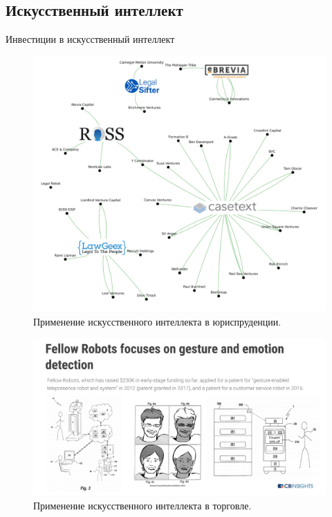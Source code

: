 \documentclass[12pt]{beamer}
\begin{document}
\subsection{Искусственный интеллект}
\begin{frame}{Инвестиции в искусственный интеллект}
\begin{figure}
	\centering
	\includegraphics[scale=.30]{img/AI_in_law}
	\caption{Применение искусственного интеллекта в юриспруденции.}
\end{figure}
\end{frame}
\begin{frame}
\begin{figure}
\centering
\includegraphics[scale=.35]{img/AI_gesture_emotion_detecture}
\caption{Применение искусственного интеллекта в торговле.}
\end{figure}
\end{frame}
\end{document}
